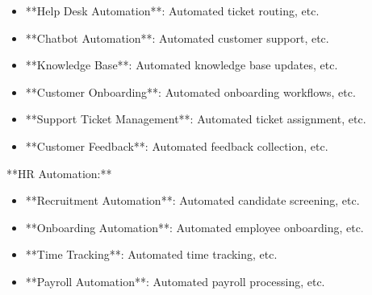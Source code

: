\documentclass[11pt,a4paper]{article}
\begin{document}
\begin{itemize}
\item **Help Desk Automation**: Automated ticket routing, etc.
\end{itemize}

\begin{itemize}
\item **Chatbot Automation**: Automated customer support, etc.
\end{itemize}

\begin{itemize}
\item **Knowledge Base**: Automated knowledge base updates, etc.
\end{itemize}

\begin{itemize}
\item **Customer Onboarding**: Automated onboarding workflows, etc.
\end{itemize}

\begin{itemize}
\item **Support Ticket Management**: Automated ticket assignment, etc.
\end{itemize}

\begin{itemize}
\item **Customer Feedback**: Automated feedback collection, etc.
\end{itemize}

**HR Automation:**

\begin{itemize}
\item **Recruitment Automation**: Automated candidate screening, etc.
\end{itemize}

\begin{itemize}
\item **Onboarding Automation**: Automated employee onboarding, etc.
\end{itemize}

\begin{itemize}
\item **Time Tracking**: Automated time tracking, etc.
\end{itemize}

\begin{itemize}
\item **Payroll Automation**: Automated payroll processing, etc.
\end{itemize}
\end{document}
